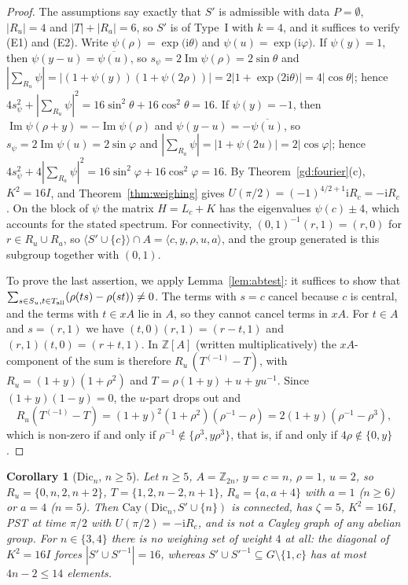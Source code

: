 \documentclass[preprint,11pt]{elsarticle}
\newtheorem{corollary}[theorem]{Corollary}
\theoremstyle{definition}
\theoremstyle{remark}
\newcommand{\Z}{\mathbb Z}
\newcommand{\ii}{\mathrm i}
\begin{document}
\begin{proof}
The assumptions say exactly that $S'$ is admissible with data $P=\emptyset$, $|R_u|=4$ and $|T|+|R_a|=6$, so $S'$ is of Type~I with $k=4$, and it suffices to verify (E1) and (E2). Write $\psi(\rho)=\exp\bigl(\ii\theta\bigr)$ and $\psi(u)=\exp\bigl(\ii\varphi\bigr)$. If $\psi(y)=1$, then $\psi(y-u)=\overline{\psi(u)}$, so $s_\psi=2\operatorname{Im}\psi(\rho)=2\sin\theta$ and $|\sum_{R_u}\psi|=|(1+\psi(y))(1+\psi(2\rho))|=2|1+\exp\bigl(2\ii\theta\bigr)|=4|\cos\theta|$; hence $4s_\psi^2+|\sum_{R_u}\psi|^2=16\sin^2\theta+16\cos^2\theta=16$. If $\psi(y)=-1$, then $\operatorname{Im}\psi(\rho+y)=-\operatorname{Im}\psi(\rho)$ and $\psi(y-u)=-\overline{\psi(u)}$, so $s_\psi=2\operatorname{Im}\psi(u)=2\sin\varphi$ and $|\sum_{R_a}\psi|=|1+\psi(2u)|=2|\cos\varphi|$; hence $4s_\psi^2+4|\sum_{R_a}\psi|^2=16\sin^2\varphi+16\cos^2\varphi=16$. By Theorem~\ref{gd:fourier}(c), $K^2=16I$, and Theorem~\ref{thm:weighing} gives $U(\pi/2)=(-1)^{4/2+1}\ii R_c=-\ii R_c$. On the block of $\psi$ the matrix $H=L_c+K$ has the eigenvalues $\psi(c)\pm4$, which accounts for the stated spectrum. For connectivity, $(0,1)^{-1}(r,1)=(r,0)$ for $r\in R_u\cup R_a$, so $\langle S'\cup\{c\}\rangle\cap A=\langle c,y,\rho,u,a\rangle$, and the group generated is this subgroup together with $(0,1)$.

To prove the last assertion, we apply Lemma~\ref{lem:abtest}: it suffices to show that $\sum_{s\in S_u,t\in T_{\rm all}}(\rho(ts)-\rho(st))\ne0$. The terms with $s=c$ cancel because $c$ is central, and the terms with $t\in xA$ lie in $A$, so they cannot cancel terms in $xA$. For $t\in A$ and $s=(r,1)$ we have $(t,0)(r,1)=(r-t,1)$ and $(r,1)(t,0)=(r+t,1)$. In $\Z[A]$ (written multiplicatively) the $xA$-component of the sum is therefore $R_u\,(T^{(-1)}-T)$, with $R_u=(1+y)(1+\rho^2)$ and $T=\rho(1+y)+u+yu^{-1}$. Since $(1+y)(1-y)=0$, the $u$-part drops out and
\[
R_u(T^{(-1)}-T)=(1+y)^2(1+\rho^2)(\rho^{-1}-\rho)=2(1+y)(\rho^{-1}-\rho^{3}),
\]
which is non-zero if and only if $\rho^{-1}\notin\{\rho^3,y\rho^3\}$, that is, if and only if $4\rho\notin\{0,y\}$.
\end{proof}

\begin{corollary}[$\mathrm{Dic}_n$, $n\ge5$]\label{gd:dicn}
Let $n\ge5$, $A=\Z_{2n}$, $y=c=n$, $\rho=1$, $u=2$, so $R_u=\{0,n,2,n+2\}$, $T=\{1,2,n-2,n+1\}$, $R_a=\{a,a+4\}$ with $a=1$ ($n\ge6$) or $a=4$ ($n=5$). Then $\mathrm{Cay}(\mathrm{Dic}_n,S'\cup\{n\})$ is connected, has $\zeta=5$, $K^2=16I$, PST at time $\pi/2$ with $U(\pi/2)=-\ii R_c$, and is not a Cayley graph of any abelian group. For $n\in\{3,4\}$ there is no weighing set of weight $4$ at all: the diagonal of $K^2=16I$ forces $|S'\cup S'^{-1}|=16$, whereas $S'\cup S'^{-1}\subseteq G\setminus\{1,c\}$ has at most $4n-2\le14$ elements.
\end{corollary}
\end{document}
